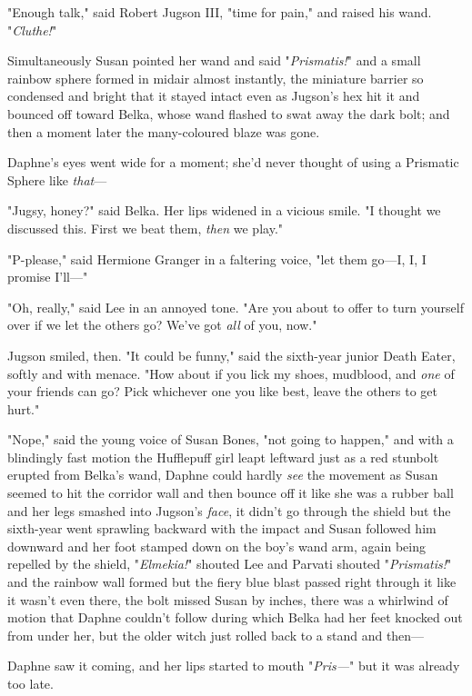 "Enough talk," said Robert Jugson III, "time for pain," and raised his wand.
"\emph{Cluthe!}"

Simultaneously Susan pointed her wand and said "\emph{Prismatis!}" and a small
rainbow sphere formed in midair almost instantly, the miniature barrier so
condensed and bright that it stayed intact even as Jugson's hex hit it and
bounced off toward Belka, whose wand flashed to swat away the dark bolt; and
then a moment later the many-coloured blaze was gone.

Daphne's eyes went wide for a moment; she'd never thought of using a Prismatic
Sphere like \emph{that}---

"Jugsy, honey?" said Belka. Her lips widened in a vicious smile. "I thought we
discussed this. First we beat them, \emph{then} we play."

"P-please," said Hermione Granger in a faltering voice, "let them go---I, I, I
promise I'll---"

"Oh, really," said Lee in an annoyed tone. "Are you about to offer to turn
yourself over if we let the others go? We've got \emph{all} of you, now."

Jugson smiled, then. "It could be funny," said the sixth-year junior Death
Eater, softly and with menace. "How about if you lick my shoes, mudblood, and
\emph{one} of your friends can go? Pick whichever one you like best, leave the
others to get hurt."

"Nope," said the young voice of Susan Bones, "not going to happen," and with a
blindingly fast motion the Hufflepuff girl leapt leftward just as a red
stunbolt erupted from Belka's wand, Daphne could hardly \emph{see} the movement
as Susan seemed to hit the corridor wall and then bounce off it like she was a
rubber ball and her legs smashed into Jugson's \emph{face}, it didn't go
through the shield but the sixth-year went sprawling backward with the impact
and Susan followed him downward and her foot stamped down on the boy's wand
arm, again being repelled by the shield, "\emph{Elmekia!}" shouted Lee and
Parvati shouted "\emph{Prismatis!}" and the rainbow wall formed but the fiery
blue blast passed right through it like it wasn't even there, the bolt missed
Susan by inches, there was a whirlwind of motion that Daphne couldn't follow
during which Belka had her feet knocked out from under her, but the older witch
just rolled back to a stand and then---

Daphne saw it coming, and her lips started to mouth "\emph{Pris---}" but it was
already too late.

